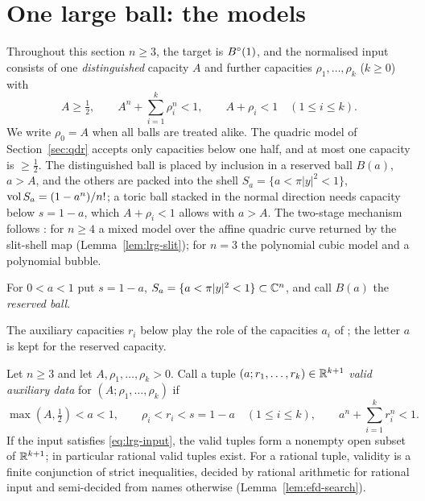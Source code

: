 \section{One large ball: the models}\label{sec:lrg}

Throughout this section $n\ge3$, the target is $B^{\circ}(1)$, and the normalised input consists of one
\emph{distinguished} capacity $A$ and further capacities $\rho_1,\dots,\rho_k$ ($k\ge0$) with
\begin{equation}\label{eq:lrg-input}
 A\ge\tfrac12,\qquad A^n+\sum_{i=1}^k\rho_i^n<1,\qquad A+\rho_i<1\quad(1\le i\le k).
\end{equation}
We write $\rho_0=A$ when all balls are treated alike.
The quadric model of Section~\ref{sec:qdr} accepts only capacities below one half, and at most one capacity is
$\ge\frac12$. The distinguished ball is placed by inclusion in a reserved ball $B(a)$, $a>A$, and the others are
packed into the shell $S_a=\{a<\pi|y|^2<1\}$, $\operatorname{vol} S_a=(1-a^n)/n!$; a toric ball stacked in the normal direction
needs capacity below $s=1-a$, which $A+\rho_i<1$ allows with $a>A$. The two-stage mechanism follows
\cite{OpenAI2026}: for $n\ge4$ a mixed model over the affine quadric curve returned by the slit-shell map
(Lemma~\ref{lem:lrg-slit}); for $n=3$ the polynomial cubic model and a polynomial bubble.

\begin{definition}\label{def:lrg-shell}
For $0<a<1$ put $s=1-a$, $S_a=\{a<\pi|y|^2<1\}\subset\mathbb{C}^n$, and call $B(a)$ the \emph{reserved ball}.
\end{definition}

The auxiliary capacities $r_i$ below play the role of the capacities $a_i$ of ;
the letter $a$ is kept for the reserved capacity.

\begin{lemma}\label{lem:lrg-auxiliary}
Let $n\ge3$ and let $A,\rho_1,\dots,\rho_k>0$. Call a tuple $(a;r_1,\dots,r_k)\in\mathbb{R}^{k+1}$
\emph{valid auxiliary data} for $(A;\rho_1,\dots,\rho_k)$ if
\begin{equation}\label{eq:lrg-certificate}
 \max(A,\tfrac12)<a<1,\qquad \rho_i<r_i<s=1-a\quad(1\le i\le k),\qquad a^n+\sum_{i=1}^kr_i^n<1 .
\end{equation}
If the input satisfies \eqref{eq:lrg-input}, the valid tuples form a nonempty open subset of $\mathbb{R}^{k+1}$; in
particular rational valid tuples exist. For a rational tuple, validity is a finite conjunction of strict inequalities,
decided by rational arithmetic for rational input and semi-decided from names otherwise
(Lemma~\ref{lem:efd-search}).
\end{lemma}

